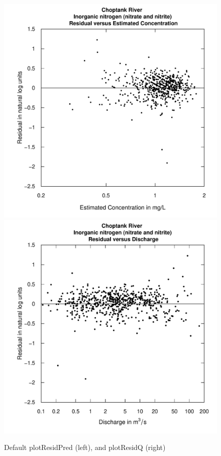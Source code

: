 \documentclass[a4paper,11pt]{article}\usepackage{graphicx, color}
\newenvironment{knitrout}{}{} %
\begin{document}
\begin{knitrout}
\color{fgcolor}\begin{figure}[]

\includegraphics[width=.5\linewidth,height=.5\linewidth]{figure/plotResidQ1} 
\includegraphics[width=.5\linewidth,height=.5\linewidth]{figure/plotResidQ2} \caption[Default plotResidPred (left), and plotResidQ (right)]{Default plotResidPred (left), and plotResidQ (right)\label{fig:plotResidQ}}
\end{figure}


\end{knitrout}
\end{document}
